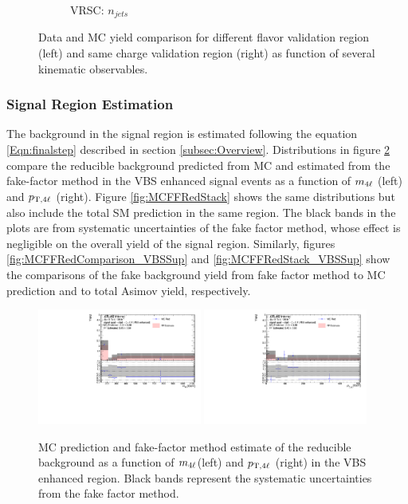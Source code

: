 \begin{figure}[htb]
\begin{subfigure}{.48\textwidth}
        \caption{VRSC: $n_{jets}$}
    \end{subfigure}
		\caption{ Data and MC yield comparison for different flavor validation region (left) and same charge validation region (right) as function of several kinematic observables.\label{fig:AllDataMCYield}}
\end{figure}

\subsubsection{Signal Region Estimation}
\label{subsubsec:SREstimation}
The background in the signal region is estimated following the equation \ref{Eqn:finalstep} described in section \ref{subsec:Overview}. Distributions in figure \ref{fig:MCFFRedComparison} compare the reducible background predicted from MC and estimated from the fake-factor method in the VBS enhanced signal events as a function of $m_{4\ell}$ (left) and $p_{\textrm{T} ,4\ell}$ (right). Figure \ref{fig:MCFFRedStack} shows the same distributions but also include the total SM prediction in the same region. The black bands in the plots are from systematic uncertainties of the fake factor method, whose effect is negligible on the overall yield of the signal region. Similarly, figures \ref{fig:MCFFRedComparison_VBSSup} and  \ref{fig:MCFFRedStack_VBSSup} show the comparisons of the fake background yield from fake factor method to MC prediction and to total Asimov yield, respectively.

\begin{figure}[htb]
	\centering
	\includegraphics[width=0.48\textwidth]{figures/Analysis/Background/MCRedCompare_VBS_Enhanced_M4l.pdf}
	\includegraphics[width=0.48\textwidth]{figures/Analysis/Background/MCRedCompare_VBS_Enhanced_Pt4l.pdf}
	\caption{ MC prediction and fake-factor method estimate of the reducible background as a function of $m_{4\ell}$(left) and $p_{\textrm{T} ,4\ell}$ (right) in the VBS enhanced region. Black bands represent the systematic uncertainties from the fake factor method. \label{fig:MCFFRedComparison}}
\end{figure}


